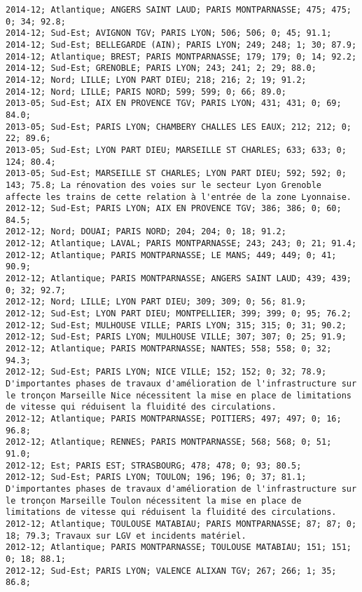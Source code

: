 \documentclass{article}
\begin{document}
\begin{Verbatim}[commandchars=\\\{\}]
2014-12; Atlantique; ANGERS SAINT LAUD; PARIS MONTPARNASSE; 475; 475; 0; 34; 92.8; 
2014-12; Sud-Est; AVIGNON TGV; PARIS LYON; 506; 506; 0; 45; 91.1; 
2014-12; Sud-Est; BELLEGARDE (AIN); PARIS LYON; 249; 248; 1; 30; 87.9; 
2014-12; Atlantique; BREST; PARIS MONTPARNASSE; 179; 179; 0; 14; 92.2; 
2014-12; Sud-Est; GRENOBLE; PARIS LYON; 243; 241; 2; 29; 88.0; 
2014-12; Nord; LILLE; LYON PART DIEU; 218; 216; 2; 19; 91.2; 
2014-12; Nord; LILLE; PARIS NORD; 599; 599; 0; 66; 89.0; 
2013-05; Sud-Est; AIX EN PROVENCE TGV; PARIS LYON; 431; 431; 0; 69; 84.0; 
2013-05; Sud-Est; PARIS LYON; CHAMBERY CHALLES LES EAUX; 212; 212; 0; 22; 89.6; 
2013-05; Sud-Est; LYON PART DIEU; MARSEILLE ST CHARLES; 633; 633; 0; 124; 80.4; 
2013-05; Sud-Est; MARSEILLE ST CHARLES; LYON PART DIEU; 592; 592; 0; 143; 75.8; La rénovation des voies sur le secteur Lyon Grenoble affecte les trains de cette relation à l'entrée de la zone Lyonnaise.
2012-12; Sud-Est; PARIS LYON; AIX EN PROVENCE TGV; 386; 386; 0; 60; 84.5; 
2012-12; Nord; DOUAI; PARIS NORD; 204; 204; 0; 18; 91.2; 
2012-12; Atlantique; LAVAL; PARIS MONTPARNASSE; 243; 243; 0; 21; 91.4; 
2012-12; Atlantique; PARIS MONTPARNASSE; LE MANS; 449; 449; 0; 41; 90.9; 
2012-12; Atlantique; PARIS MONTPARNASSE; ANGERS SAINT LAUD; 439; 439; 0; 32; 92.7; 
2012-12; Nord; LILLE; LYON PART DIEU; 309; 309; 0; 56; 81.9; 
2012-12; Sud-Est; LYON PART DIEU; MONTPELLIER; 399; 399; 0; 95; 76.2; 
2012-12; Sud-Est; MULHOUSE VILLE; PARIS LYON; 315; 315; 0; 31; 90.2; 
2012-12; Sud-Est; PARIS LYON; MULHOUSE VILLE; 307; 307; 0; 25; 91.9; 
2012-12; Atlantique; PARIS MONTPARNASSE; NANTES; 558; 558; 0; 32; 94.3; 
2012-12; Sud-Est; PARIS LYON; NICE VILLE; 152; 152; 0; 32; 78.9; D'importantes phases de travaux d'amélioration de l'infrastructure sur le tronçon Marseille Nice nécessitent la mise en place de limitations de vitesse qui réduisent la fluidité des circulations.
2012-12; Atlantique; PARIS MONTPARNASSE; POITIERS; 497; 497; 0; 16; 96.8; 
2012-12; Atlantique; RENNES; PARIS MONTPARNASSE; 568; 568; 0; 51; 91.0; 
2012-12; Est; PARIS EST; STRASBOURG; 478; 478; 0; 93; 80.5; 
2012-12; Sud-Est; PARIS LYON; TOULON; 196; 196; 0; 37; 81.1; D'importantes phases de travaux d'amélioration de l'infrastructure sur le tronçon Marseille Toulon nécessitent la mise en place de limitations de vitesse qui réduisent la fluidité des circulations.
2012-12; Atlantique; TOULOUSE MATABIAU; PARIS MONTPARNASSE; 87; 87; 0; 18; 79.3; Travaux sur LGV et incidents matériel.
2012-12; Atlantique; PARIS MONTPARNASSE; TOULOUSE MATABIAU; 151; 151; 0; 18; 88.1; 
2012-12; Sud-Est; PARIS LYON; VALENCE ALIXAN TGV; 267; 266; 1; 35; 86.8; 

\end{Verbatim}
\end{document}
